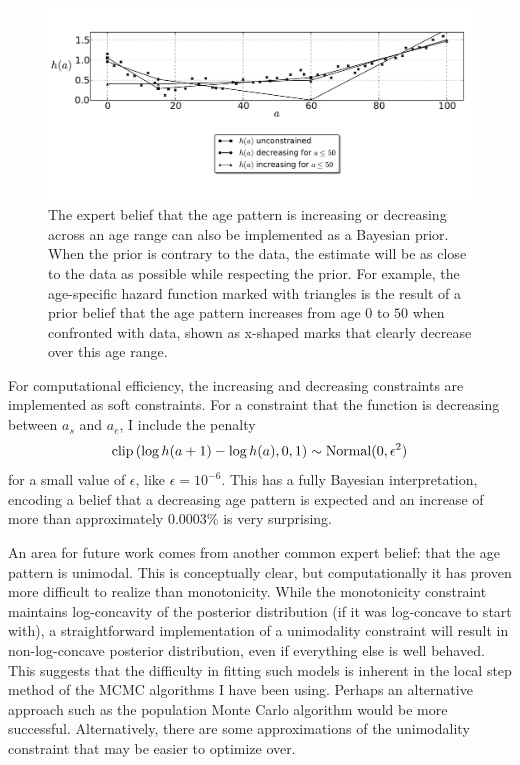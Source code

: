 \begin{figure}[h]
\begin{center}
\includegraphics[width=\textwidth]{monotone-smoothing-splines.pdf}
\caption[An informative prior that the age pattern is increasing or
  decreasing across an age range.]{The expert belief that the age
  pattern is increasing or
  decreasing across an age range can also be implemented as a Bayesian
  prior.  When the prior is contrary to the data, the estimate will be
  as close to the data as possible while respecting the prior.  For
  example, the age-specific hazard function marked with triangles is the result
  of a prior belief that the age pattern increases from age $0$ to
  $50$ when confronted with data, shown as x-shaped marks that
  clearly decrease over this age range.}
\label{monotone-age-pattern}
\end{center}
\end{figure}


For computational efficiency, the increasing and decreasing
constraints are implemented as soft constraints.  For a constraint
that the function is decreasing between $a_s$ and $a_e$, I include the penalty
\[
\operatorname{clip}\left(\log h(a+1) - \log h(a), 0, 1\right) \sim \operatorname{Normal}(0, \epsilon^2)
\]
for a small value of $\epsilon$, like $\epsilon = 10^{-6}$.  This has
a fully Bayesian interpretation, encoding a belief that a decreasing age pattern is expected
and an increase of more than approximately $0.0003$\% is very surprising.


An area for future work comes from another common expert belief: that
the age pattern is unimodal.  This is conceptually clear, but
computationally it has proven more difficult to realize than
monotonicity.  While the monotonicity constraint maintains
log-concavity of the posterior distribution (if it was log-concave to
start with), a straightforward implementation of a unimodality
constraint will result in non-log-concave posterior distribution, even
if everything else is well behaved.  This suggests that the difficulty
in fitting such models is inherent in the local step method of the
MCMC algorithms I have been using.  Perhaps an alternative approach
such as the population Monte Carlo algorithm would be more successful.
Alternatively, there are some approximations of the unimodality
constraint that may be easier to optimize over.\cite{papp_shape_2012}

